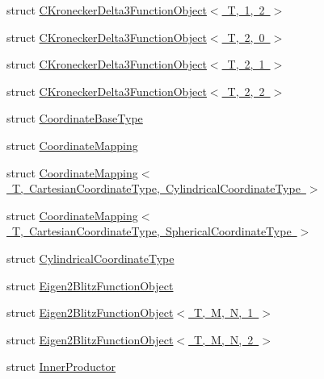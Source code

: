 \begin{DoxyCompactItemize}
\item 
struct \mbox{\hyperlink{structmpc_1_1utilities_1_1_c_kronecker_delta3_function_object_3_01_t_00_011_00_012_01_4}{C\+Kronecker\+Delta3\+Function\+Object$<$ T, 1, 2 $>$}}
\item 
struct \mbox{\hyperlink{structmpc_1_1utilities_1_1_c_kronecker_delta3_function_object_3_01_t_00_012_00_010_01_4}{C\+Kronecker\+Delta3\+Function\+Object$<$ T, 2, 0 $>$}}
\item 
struct \mbox{\hyperlink{structmpc_1_1utilities_1_1_c_kronecker_delta3_function_object_3_01_t_00_012_00_011_01_4}{C\+Kronecker\+Delta3\+Function\+Object$<$ T, 2, 1 $>$}}
\item 
struct \mbox{\hyperlink{structmpc_1_1utilities_1_1_c_kronecker_delta3_function_object_3_01_t_00_012_00_012_01_4}{C\+Kronecker\+Delta3\+Function\+Object$<$ T, 2, 2 $>$}}
\item 
struct \mbox{\hyperlink{structmpc_1_1utilities_1_1_coordinate_base_type}{Coordinate\+Base\+Type}}
\item 
struct \mbox{\hyperlink{structmpc_1_1utilities_1_1_coordinate_mapping}{Coordinate\+Mapping}}
\item 
struct \mbox{\hyperlink{structmpc_1_1utilities_1_1_coordinate_mapping_3_01_t_00_01_cartesian_coordinate_type_00_01_cylindrical_coordinate_type_01_4}{Coordinate\+Mapping$<$ T, Cartesian\+Coordinate\+Type, Cylindrical\+Coordinate\+Type $>$}}
\item 
struct \mbox{\hyperlink{structmpc_1_1utilities_1_1_coordinate_mapping_3_01_t_00_01_cartesian_coordinate_type_00_01_spherical_coordinate_type_01_4}{Coordinate\+Mapping$<$ T, Cartesian\+Coordinate\+Type, Spherical\+Coordinate\+Type $>$}}
\item 
struct \mbox{\hyperlink{structmpc_1_1utilities_1_1_cylindrical_coordinate_type}{Cylindrical\+Coordinate\+Type}}
\item 
struct \mbox{\hyperlink{structmpc_1_1utilities_1_1_eigen2_blitz_function_object}{Eigen2\+Blitz\+Function\+Object}}
\item 
struct \mbox{\hyperlink{structmpc_1_1utilities_1_1_eigen2_blitz_function_object_3_01_t_00_01_m_00_01_n_00_011_01_4}{Eigen2\+Blitz\+Function\+Object$<$ T, M, N, 1 $>$}}
\item 
struct \mbox{\hyperlink{structmpc_1_1utilities_1_1_eigen2_blitz_function_object_3_01_t_00_01_m_00_01_n_00_012_01_4}{Eigen2\+Blitz\+Function\+Object$<$ T, M, N, 2 $>$}}
\item 
struct \mbox{\hyperlink{structmpc_1_1utilities_1_1_inner_productor}{Inner\+Productor}}

\end{DoxyCompactItemize}
